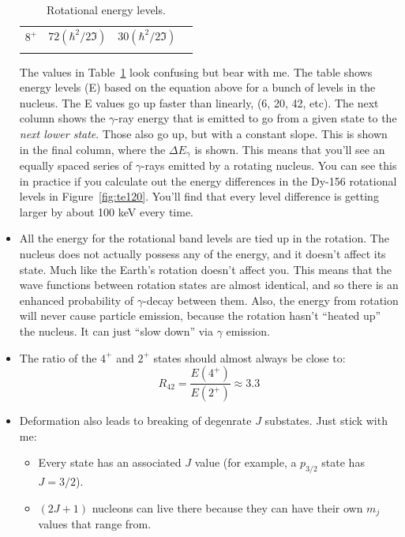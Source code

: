 \documentclass[letter]{article}
\begin{document}
\begin{itemize}
\begin{table}[hbt]
\begin{tabular}{llll}
$8^+$          & $72(\hbar^2/2\Im)$ & $30(\hbar^2/2\Im)$  &                      \\
               &                    &                    &                     
\end{tabular}
\caption{Rotational energy levels.}
\label{tab:rotation}
\end{table}
The values in Table~\ref{tab:rotation} look confusing but bear with
me. The table shows energy levels (E) based on the
equation above for a bunch of levels in the nucleus. The E values go up faster
than linearly, (6, 20, 42, etc). The next column shows the 
$\gamma$-ray energy that is emitted to go from a given state to the
\textit{next lower state}. Those also go up, but with a constant
slope. This is shown in the final column, where the $\Delta{}E_\gamma$
is shown. This means that you'll see an equally spaced series of
$\gamma$-rays emitted by a rotating nucleus. You can see this in
practice if you calculate out the energy differences in the Dy-156
rotational levels in Figure~\ref{fig:te120}. You'll find that every
level difference is getting larger by about 100 keV every time.
~\cite[Lec 13-16]{lecture}
\item All the energy for the rotational band levels are tied up in the
  rotation. The nucleus does not actually possess any of the energy,
  and it doesn't affect its state. Much like the Earth's rotation
  doesn't affect you. This means that the wave functions between
  rotation states are almost identical, and so there is an enhanced
  probability of $\gamma$-decay between them. Also, the energy from
  rotation will never cause particle emission, because the rotation
  hasn't ``heated up'' the nucleus. It can just ``slow down'' via
  $\gamma$ emission.\cite[Lec. 13-16]{lecture}
\item The ratio of the $4^+$ and $2^+$ states should almost always be
  close to:
  \begin{equation*}
    R_{42}=\frac{E(4^+)}{E(2^+)} \approx 3.3
  \end{equation*}
\item Deformation also leads to breaking of degenrate $J$
  substates. Just stick with me:
  \begin{itemize}
  \item Every state has an associated $J$ value (for example, a $p_{3/2}$
    state has $J=3/2$).
  \item $(2J+1)$ nucleons can live there because they can have their
    own $m_j$ values that range from.
  \end{itemize}
\end{itemize}
\end{document}
